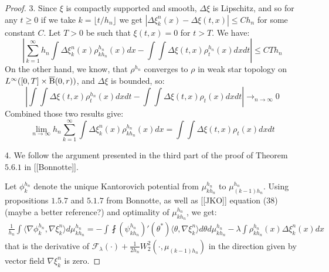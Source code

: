 \begin{proof}
3. Since $\xi$ is compactly supported and smooth, $\Delta \xi$ is Lipschitz, and so for any $ t \geq 0$ if we take $k = \lfloor t/h_n \rfloor$ we get $| \Delta \xi_k^n(x) - \Delta \xi(t,x) | \leq C h_n$ for some constant $C$. Let $T > 0$ be such that $\xi(t,x) = 0 $ for $t > T$. We have:
\[
\left| \sum_{k=1}^{\infty} h_n \int \Delta \xi_k^n(x) \rho_{kh_n}^{h_n}(x) dx - \int \int \Delta \xi(t,x) \rho_{t}^{h_n}(x) dx dt \right| \leq CTh_n 
\]
On the other hand,  we know, that $\rho^{h_n}$ converges to $\rho$ in weak star topology on $L^{\infty}([0,T] \times \operatorname{\overline{B}}(0,r))$, and $\Delta \xi$ is bounded, so:
\[
\left| \int \int \Delta \xi(t,x) \rho_{t}^{h_n}(x) dx dt - \int \int \Delta \xi (t,x) \rho_t(x) dx dt \right| \rightarrow_{n \rightarrow \infty} 0
\]
Combined those two results give:
\begin{equation} \label{thm:cont_proof_part3}
\lim_{n \rightarrow \infty} h_n \sum_{k=1}^{\infty} \int \Delta \xi_k^n(x) \rho_{kh_n}^{h_n}(x) dx = \int \int \Delta \xi (t,x) \rho_t(x) dx dt
\end{equation}



4. We follow the argument presented in the third part of the proof of Theorem $5.6.1$ in [[Bonnotte]].

Let $\phi_{k}^{h_n}$ denote the unique Kantorovich potential from $\mu_{kh_n}^{h_n}$ to $\mu_{(k-1)h_n}^{h_n}$. Using propositions $1.5.7$ and $5.1.7$ from Bonnotte, as well as [[JKO]] equation (38) (maybe a better reference?) and optimality of $\mu_{kh_n}^{h_n}$, we get:
\begin{multline} \label{thm:cont_proof_eq0}
\frac{1}{h_n} \int \langle \nabla \phi_k^{h_n} , \nabla \xi_{k}^n \rangle d\mu_{kh_n}^{h_n} =  - \int \fint (\psi_{kh_n}^{h_n})'(\theta^{*}) \langle \theta, \nabla \xi_k^n \rangle d\theta d\mu_{kh_n}^{h_n} - \lambda \int  \rho_{kh_n}^{h_n}(x) \Delta \xi_k^n(x)  dx 
\end{multline}
that is the derivative of $\mathcal{F}_{\lambda}(\cdot) + \frac{1}{2h_n}W_2^2(\cdot, \mu_{(k-1)h_n})$ in the direction given by vector field $\nabla \xi_k^n$ is zero.


\end{proof}
